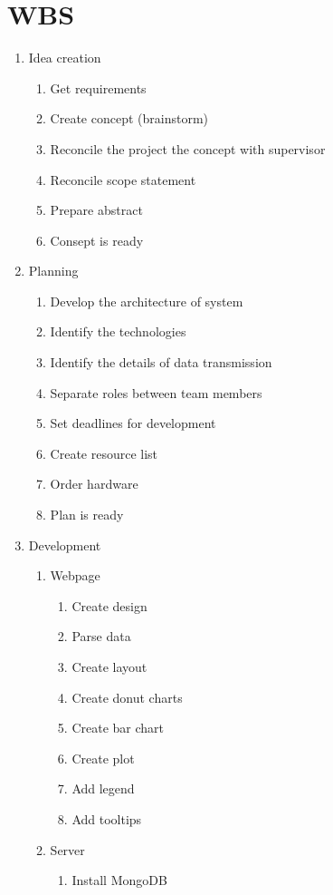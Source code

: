 \documentclass[english]{article}
\begin{document}
\section{WBS}
\begin{enumerate}
\item Idea creation
	\begin{enumerate}[label*=\arabic*]
	\item Get requirements
	\item Create concept (brainstorm)
	\item Reconcile the project the concept with supervisor
	\item Reconcile scope statement
	\item Prepare abstract
	\item Consept is ready
	\end{enumerate}
\item Planning
	\begin{enumerate}[label*=\arabic*]
	\item Develop the architecture of system
	\item Identify the technologies
	\item Identify the details of data transmission
	\item Separate roles between team members
	\item Set deadlines for development
	\item Create resource list
	\item Order hardware
	\item Plan is ready
	\end{enumerate}
\item Development 
	\begin{enumerate}[label*=\arabic*]
	\item Webpage
		\begin{enumerate}[label*=\arabic*]
		\item Create design
		\item Parse data
		\item Create layout
		\item Create donut charts
		\item Create bar chart
		\item Create plot
		\item Add legend
		\item Add tooltips
		\end{enumerate}
	\item Server
		\begin{enumerate}[label*=\arabic*]
		\item Install MongoDB

\end{enumerate}
\end{enumerate}
\end{enumerate}
\end{document}
